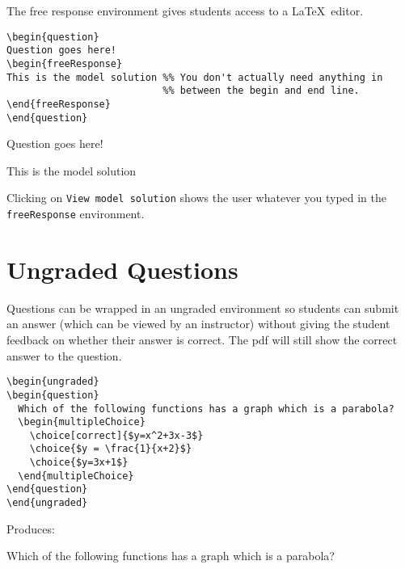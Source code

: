 \documentclass{ximera}
\begin{document}
The free response environment gives students access to a \LaTeX\ editor. 

\begin{verbatim}
\begin{question}
Question goes here!
\begin{freeResponse}
This is the model solution %% You don't actually need anything in 
                           %% between the begin and end line.
\end{freeResponse} 
\end{question}
\end{verbatim}

\begin{question}
	Question goes here!
	\begin{freeResponse}
	This is the model solution %
	\end{freeResponse} 
\end{question}

\begin{remark}
Clicking on \verb!View model solution! shows the user
whatever you typed in the  \verb!freeResponse! environment.
\end{remark}

\section{Ungraded Questions}

Questions can be wrapped in an ungraded environment so students can submit an answer (which can be viewed by an instructor) without giving the student feedback on whether their answer is correct. The pdf will still show the correct answer to the question.

\begin{verbatim}
\begin{ungraded}
\begin{question}
  Which of the following functions has a graph which is a parabola?
  \begin{multipleChoice}
    \choice[correct]{$y=x^2+3x-3$}
    \choice{$y = \frac{1}{x+2}$}
    \choice{$y=3x+1$}
  \end{multipleChoice}
\end{question}
\end{ungraded}
\end{verbatim}

Produces:

\begin{ungraded}
\begin{question}
  Which of the following functions has a graph which is a parabola?
  \begin{multipleChoice}
  \end{multipleChoice}
\end{question}
\end{ungraded}
\end{document}
